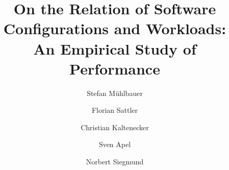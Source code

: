 \documentclass[sigconf,screen,anonymous,review]{acmart}
\begin{document}
	
	\title[On the Relation of Software Configurations and Workloads: An Empirical Study of Performance]{\texorpdfstring{On the Relation of Software Configurations and Workloads:\\ An Empirical Study of Performance}{On the Relation of Software Configurations and Workloads: An Empirical Study of Performance}}
	
	\author{Stefan Mühlbauer}

	\author{Florian Sattler}

	\author{Christian Kaltenecker}

	\author{Sven Apel}

	\author{Norbert Siegmund}
	
	

	
	\renewcommand{\shortauthors}{Mühlbauer et al.}
	
	
	
\end{document}
